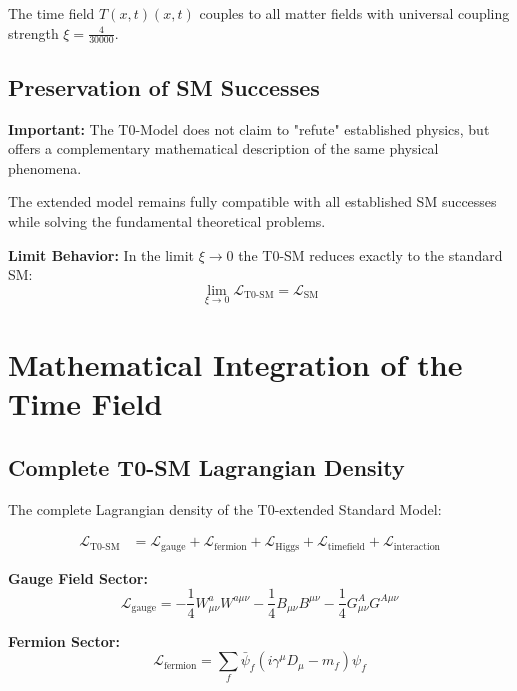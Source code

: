 \documentclass[12pt,a4paper]{report}
\newcommand{\Tfield}{T(x,t)}  %
\newcommand{\xipar}{\xi}      %
\begin{document}
	The time field $\Tfield(x,t)$ couples to all matter fields with universal coupling strength $\xipar = \frac{4}{30000}$.
	
	\subsection{Preservation of SM Successes}\label{subsec:preservation_sm_successes}
	
	\textbf{Important:} The T0-Model does not claim to "refute" established physics, but offers a complementary mathematical description of the same physical phenomena.
	
	The extended model remains fully compatible with all established SM successes while solving the fundamental theoretical problems.
	
	\textbf{Limit Behavior:}
	In the limit $\xipar \to 0$ the T0-SM reduces exactly to the standard SM:
	\begin{equation}
		\lim_{\xipar \to 0} \mathcal{L}_{\text{T0-SM}} = \mathcal{L}_{\text{SM}}
	\end{equation}
	
	\section{Mathematical Integration of the Time Field}\label{sec:mathematical_integration}
	
	\subsection{Complete T0-SM Lagrangian Density}\label{subsec:complete_lagrangian}
	
	The complete Lagrangian density of the T0-extended Standard Model:
	
	\begin{align}
		\mathcal{L}_{\text{T0-SM}} &= \mathcal{L}_{\text{gauge}} + \mathcal{L}_{\text{fermion}} + \mathcal{L}_{\text{Higgs}} + \mathcal{L}_{\text{timefield}} + \mathcal{L}_{\text{interaction}}
	\end{align}
	
	\textbf{Gauge Field Sector:}
	\begin{equation}
		\mathcal{L}_{\text{gauge}} = -\frac{1}{4} W_{\mu\nu}^a W^{a\mu\nu} - \frac{1}{4} B_{\mu\nu} B^{\mu\nu} - \frac{1}{4} G_{\mu\nu}^A G^{A\mu\nu}
	\end{equation}
	
	\textbf{Fermion Sector:}
	\begin{equation}
		\mathcal{L}_{\text{fermion}} = \sum_{f} \bar{\psi}_f (i\gamma^\mu D_\mu - m_f) \psi_f
	\end{equation}
	
\end{document}
